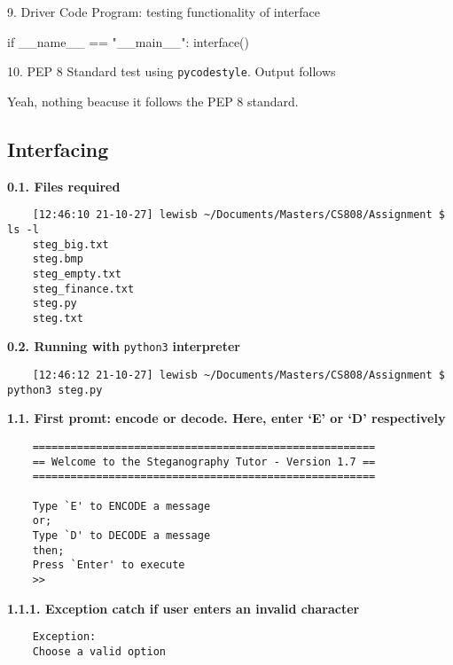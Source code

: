 \documentclass[11pt, english]{article}
\begin{document}
	9. Driver Code Program: testing functionality of interface

	{\small\begin{python}
	if __name__ == "__main__":
    	    interface()
	\end{python}}

	10. PEP 8 Standard test using \verb|pycodestyle|. Output follows

	{\small\begin{python}
	
	\end{python}}

	Yeah, nothing beacuse it follows the PEP 8 standard.

\newpage

	\subsection{Interfacing}

	\textbf{0.1. Files required}

	{\scriptsize\begin{verbatim}
	[12:46:10 21-10-27] lewisb ~/Documents/Masters/CS808/Assignment $ ls -l
	steg_big.txt
	steg.bmp
	steg_empty.txt
	steg_finance.txt
	steg.py
	steg.txt
	\end{verbatim}}

	\textbf{0.2. Running with} \verb|python3| \textbf{interpreter}

	{\scriptsize\begin{verbatim}
	[12:46:12 21-10-27] lewisb ~/Documents/Masters/CS808/Assignment $ python3 steg.py
	\end{verbatim}}

	\textbf{1.1. First promt: encode or decode. Here, enter `E' or `D' respectively}

	{\scriptsize\begin{verbatim}
	======================================================
	== Welcome to the Steganography Tutor - Version 1.7 ==
	======================================================

	Type `E' to ENCODE a message
	or;
	Type `D' to DECODE a message
	then;
	Press `Enter' to execute
	>>
        \end{verbatim}}

	\textbf{1.1.1. Exception catch if user enters an invalid character}

	{\scriptsize\begin{verbatim}
	Exception:
	Choose a valid option
	\end{verbatim}}
\end{document}

